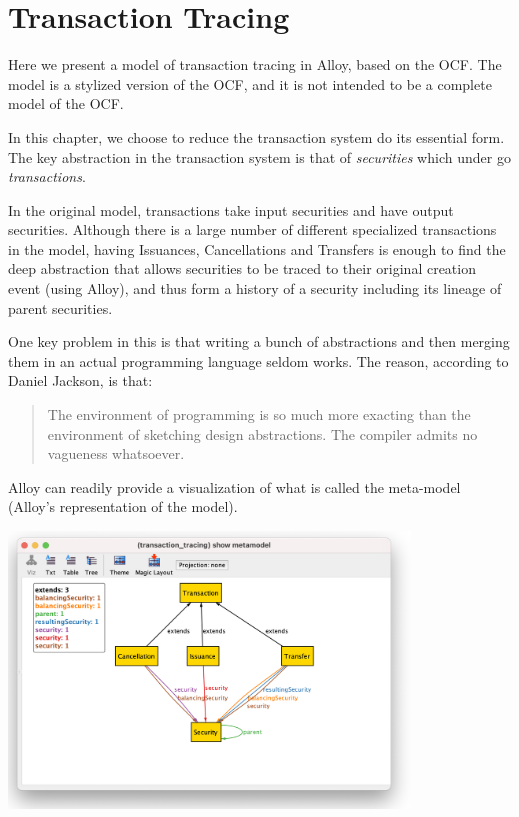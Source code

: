 \chapter{Transaction Tracing}

Here we present a model of transaction tracing in Alloy, based on the OCF. The model is a stylized version of the OCF, and it is not intended to be a complete model of the OCF.

In this chapter, we choose to reduce the transaction system do its essential form\cite{DJSALLA}. The key abstraction in the transaction system is that of \textit{securities} which under go \textit{transactions}. 

In the original model, transactions take input securities and have output securities. Although there is a large number of different specialized transactions in the model, having Issuances, Cancellations and Transfers is enough to find the deep abstraction that allows securities to be traced to their original creation event (using Alloy), and thus form a history of a security including its lineage of parent securities.

One key problem in this is that writing a bunch of abstractions and then merging them in an actual programming language seldom works\cite{DJSALLA}. The reason, according to Daniel Jackson, is that:

\begin{quotation}
	The environment of programming is so much more exacting than the environment of sketching design abstractions. The compiler admits no vagueness whatsoever.\cite{DJSALLA}
\end{quotation}

Alloy can readily provide a visualization of what is called the meta-model (Alloy's representation of the model). 

\noindent{}

\includegraphics[width=0.8\textwidth]{pics/stock-transaction-tracing.png}


